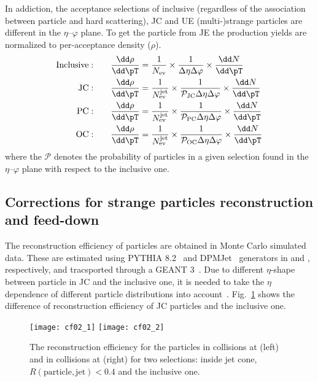 \documentclass[ALICE,manyauthors]{cernphprep}
\begin{document}
In addiction, the acceptance selections of inclusive (regardless of the association between particle and hard scattering), JC and UE (multi-)strange particles are different in the $\eta$--$\varphi$ plane.
To get the particle from JE the production yields are normalized to per-acceptance density ($\rho$).
\begin{equation}
\begin{split}
{\rm Inclusive:}\qquad & \frac{\dd\rho}{\dd\pT} = \frac{1}{N_{\rm ev}}\times\frac{1}{\Delta\eta\Delta\varphi}\times\frac{\dd N}{\dd\pT} \\
{\rm JC:}\qquad & \frac{\dd\rho}{\dd\pT} = \frac{1}{N_{\rm ev}^{\rm jet}} \times\frac{1}{\mathcal{P}_{\rm JC}\Delta\eta\Delta\varphi}\times\frac{\dd N}{\dd\pT} \\
{\rm PC:}\qquad & \frac{\dd\rho}{\dd\pT} = \frac{1}{N_{\rm ev}^{\rm jet}} \times\frac{1}{\mathcal{P}_{\rm PC}\Delta\eta\Delta\varphi}\times\frac{\dd N}{\dd\pT} \\
{\rm OC:}\qquad & \frac{\dd\rho}{\dd\pT} = \frac{1}{N_{\rm ev}^{\rm jet}} \times\frac{1}{\mathcal{P}_{\rm OC}\Delta\eta\Delta\varphi}\times\frac{\dd N}{\dd\pT} \\
\end{split}
\label{eq:normalize}
\end{equation}
where the $\mathcal{P}$ denotes the probability of particles in a given selection found in the $\eta$--$\varphi$ plane with respect to the inclusive one.

\subsection{Corrections for strange particles reconstruction and feed-down}
\label{SubSec:Correction}
The reconstruction efficiency of particles are obtained in Monte Carlo simulated data.
These are estimated using PYTHIA 8.2~\cite{Sjostrand:2014zea} and DPMJet~\cite{Roesler:2000he} generators in \pp and \pPb, respectively, and tracsported through a GEANT 3~\cite{Brun:1994aa}.
Due to different $\eta$-shape between particle in JC and the inclusive one, it is needed to take the $\eta$ dependence of different particle distributions into account~\cite{V0injet}.
Fig.~\ref{fig:EffiJCIncl} shows the difference of reconstruction efficiency of JC particles and the inclusive one.
\begin{figure}[!ht]
	\begin{center}
		\texttt{[image: cf02\_1]}
		\texttt{[image: cf02\_2]}
	\end{center}
	\caption{The reconstruction efficiency for the particles in \pp collisions at \thirteen (left) and in \pPb collisions at \fivenn (right) for two selections: inside jet cone, $R(\mathrm{particle, jet}) < 0.4$ and the inclusive one.}
	\label{fig:EffiJCIncl}
\end{figure}
\end{document}
